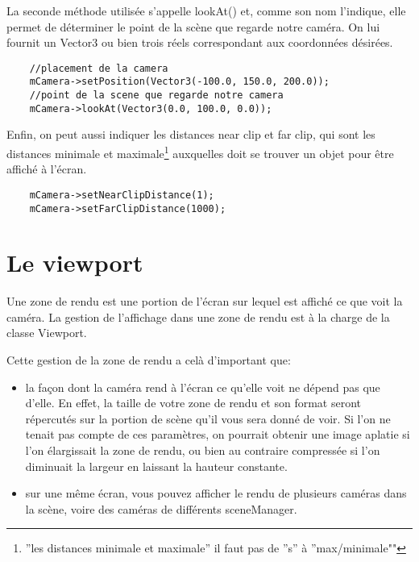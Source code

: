 \documentclass[10pt,a4paper]{report}
\begin{document}
La seconde m\'ethode utilis\'ee s'appelle lookAt() et, comme son nom l'indique, elle permet de d\'eterminer le point de la sc\`ene que regarde notre cam\'era. On lui fournit un Vector3 ou bien trois r\'eels correspondant aux coordonn\'ees d\'esir\'ees.

\begin{lstlisting}
	//placement de la camera
	mCamera->setPosition(Vector3(-100.0, 150.0, 200.0));
	//point de la scene que regarde notre camera
	mCamera->lookAt(Vector3(0.0, 100.0, 0.0));
\end{lstlisting}


Enfin, on peut aussi indiquer les distances near clip et far clip, qui sont les distances minimale et maximale\footnote{''les distances minimale et maximale'' il faut pas de ''s'' \`{a} ''max/minimale""} auxquelles doit se trouver un objet pour \^etre affich\'e \`{a} l'\'ecran.
\begin{lstlisting}
	mCamera->setNearClipDistance(1);
	mCamera->setFarClipDistance(1000);
\end{lstlisting}






\section{Le viewport}

Une zone de rendu est une portion de l'\'ecran sur lequel est affich\'e ce que voit la cam\'era. La gestion de l'affichage dans une zone de rendu est \`{a} la charge de la classe Viewport.

Cette gestion de la zone de rendu a cel\`{a} d'important que:
\begin{itemize}
\item la fa\c{c}on dont la cam\'era rend \`{a} l'\'ecran ce qu'elle voit ne d\'epend pas que d'elle. En effet, la taille de votre zone de rendu et son format seront r\'epercut\'es sur la portion de sc\`ene qu'il vous sera donn\'e de voir. Si l'on ne tenait pas compte de ces param\`etres, on pourrait obtenir une image aplatie si l'on \'elargissait la zone de rendu, ou bien au contraire compress\'ee si l'on diminuait la largeur en laissant la hauteur constante.
\item sur une m\^eme \'ecran, vous pouvez afficher le rendu de plusieurs cam\'eras dans la sc\`ene, voire des cam\'eras de diff\'erents sceneManager.
\end{itemize}
\end{document}
